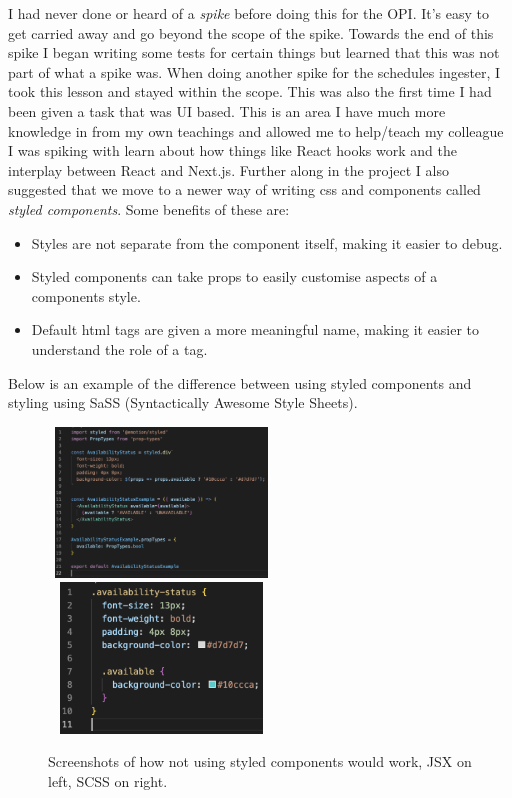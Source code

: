   \vspace{0.2cm}

  I had never done or heard of a \textit{spike} before doing this for the OPI. It's easy to get carried away and go beyond the scope of the spike.
  Towards the end of this spike I began writing some tests for certain things but learned that this was not part of what a spike was. When doing 
  another spike for the schedules ingester, I took this lesson and stayed within the scope. This was also the first time I had been given a task that
  was UI based. 
  This is an area I have much more knowledge in from my own teachings and allowed me to help/teach my colleague I was spiking with learn
  about how things like React hooks work and the interplay between React and Next.js.
  Further along in the project I also suggested that we move to a newer way of writing css and components called \textit{styled components}. Some benefits of
  these are:
  \begin{itemize}
    \item Styles are not separate from the component itself, making it easier to debug.
    \item Styled components can take props to easily customise aspects of a components style.
    \item Default html tags are given a more meaningful name, making it easier to understand the role of a tag.
  \end{itemize}

  Below is an example of the difference between using styled components and styling using SaSS (Syntactically Awesome Style Sheets).

  \begin{figure}[H]
    \centering
    \includegraphics[width=6cm, height=4cm]{assets/StyledCompsOldJSX.png}
    \includegraphics[width=6cm, height=4cm]{assets/styledCompsOldCSS.png}
    \caption{Screenshots of how not using styled components would work, JSX on left, SCSS on right.}
    \label{fig:oldStyling}
  \end{figure}

